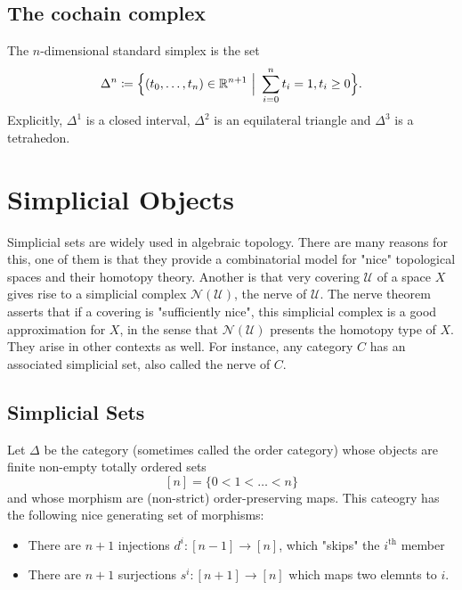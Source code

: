 \subsection{The cochain complex}
\begin{definition}
  The $n$-dimensional standard simplex is the set
  \[
    \Delta^n \coloneqq \Big\{ (t_0, \dots , t_n) \in \mathbb{R}^{n+1} \ \Big\vert \ \sum_{i = 0}^n t_i = 1, t_i \ge 0 \Big\} .
  \]
  Explicitly, $\Delta^1$ is a closed interval, $\Delta^2$ is an equilateral triangle and $\Delta^3$ is a tetrahedon.
  
\end{definition}

\section{Simplicial Objects}


Simplicial sets are widely used in algebraic topology. There are many reasons for this, one of them is that they provide a combinatorial model for "nice" topological spaces and their homotopy theory. Another is that very covering $\mathcal{U}$ of a space $X$ gives rise to a simplicial complex $\mathcal{N(U)}$, the nerve of $\mathcal{U}$. The nerve theorem asserts that if a covering is "sufficiently nice", this simplicial complex is a good approximation for $X$, in the sense that $\mathcal{N(U)}$ presents the homotopy type of $X$.\\

They arise in other contexts as well. For instance, any category $C$ has an associated simplicial set, also called the nerve of $C$.

\subsection{Simplicial Sets}
Let $\Delta$ be the category (sometimes called the order category) whose objects are finite non-empty totally ordered sets 
\[ [n] = \{0<1<\dots<n\}\]
and whose morphism are (non-strict) order-preserving maps. This cateogry has the following nice generating set of morphisms:
\begin{itemize}
  \item There are $n+1$ injections $d^i: [n-1] \to [n]$, which "skips" the $i^{\text{th}}$ member
  \item There are $n+1$ surjections $s^i: [n+1] \to [n]$ which maps two elemnts to $i$.
\end{itemize}

